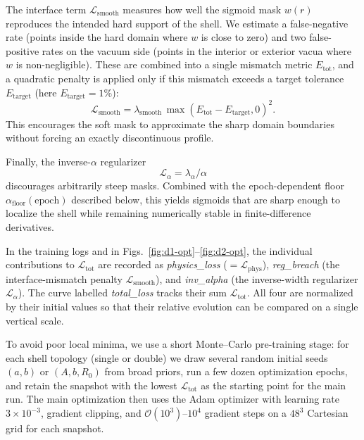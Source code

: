 \documentclass[11pt]{article}
\begin{document}
The interface term $\mathcal{L}_\text{smooth}$ measures how well the sigmoid mask $w(r)$ reproduces the intended hard support of the shell. We estimate a false-negative rate (points inside the hard domain where $w$ is close to zero) and two false-positive rates on the vacuum side (points in the interior or exterior vacua where $w$ is non-negligible). These are combined into a single mismatch metric $E_\text{tot}$, and a quadratic penalty is applied only if this mismatch exceeds a target tolerance $E_\text{target}$ (here $E_\text{target}=1\%$):
\begin{equation}
\mathcal{L}_\text{smooth} = \lambda_\text{smooth}\,\max(E_\text{tot} - E_\text{target},0)^2.
\end{equation}
This encourages the soft mask to approximate the sharp domain boundaries without forcing an exactly discontinuous profile.

Finally, the inverse-$\alpha$ regularizer
\begin{equation}
\mathcal{L}_\alpha = \lambda_\alpha/\alpha
\end{equation}
discourages arbitrarily steep masks. Combined with the epoch-dependent floor $\alpha_\text{floor}(\text{epoch})$ described below, this yields sigmoids that are sharp enough to localize the shell while remaining numerically stable in finite-difference derivatives.

In the training logs and in Figs.~\ref{fig:d1-opt}--\ref{fig:d2-opt}, the individual contributions to $\mathcal{L}_\text{tot}$ are recorded as \emph{physics\_loss} ($=\mathcal{L}_\text{phys}$), \emph{reg\_breach} (the interface-mismatch penalty $\mathcal{L}_\text{smooth}$), and \emph{inv\_alpha} (the inverse-width regularizer $\mathcal{L}_\alpha$). The curve labelled \emph{total\_loss} tracks their sum $\mathcal{L}_\text{tot}$. All four are normalized by their initial values so that their relative evolution can be compared on a single vertical scale.

To avoid poor local minima, we use a short Monte--Carlo pre-training stage: for each shell topology (single or double) we draw several random initial seeds $(a,b)$ or $(A,b,R_0)$ from broad priors, run a few dozen optimization epochs, and retain the snapshot with the lowest $\mathcal{L}_\text{tot}$ as the starting point for the main run. The main optimization then uses the Adam optimizer with learning rate $3\times10^{-3}$, gradient clipping, and $\mathcal{O}(10^3)$--$10^4$ gradient steps on a $48^3$ Cartesian grid for each snapshot.
\end{document}
